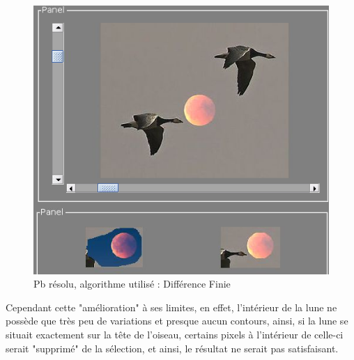 \begin{figure}[!htb]
\centering
\includegraphics[scale=0.25]{Images/sol.png}
\caption{Pb résolu, algorithme utilisé : Différence Finie}
\end{figure}\newpage
Cependant cette "amélioration" à ses limites, en effet, l'intérieur de la lune ne possède que très peu de variations et presque aucun contours, ainsi, si la lune se situait exactement sur la tête de l'oiseau, certains pixels à l'intérieur de celle-ci serait "supprimé" de la sélection, et ainsi, le résultat ne serait pas satisfaisant.
